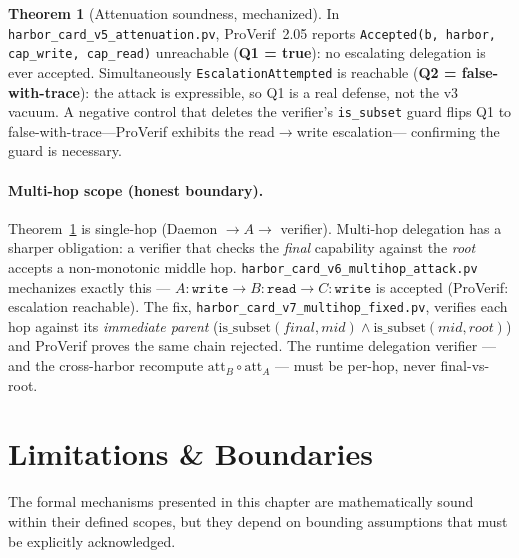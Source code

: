 \documentclass[11pt,a4paper]{article}
\theoremstyle{definition}
\newtheorem{theorem}{Theorem}[section]
\begin{document}
\begin{theorem}[Attenuation soundness, mechanized]\label{thm:attn-sound}
In \texttt{harbor\_card\_v5\_attenuation.pv}, ProVerif~2.05 reports
\texttt{Accepted(b, harbor, cap\_write, cap\_read)} unreachable
(\textbf{Q1 = true}): no escalating delegation is ever accepted. Simultaneously
\texttt{EscalationAttempted} is reachable (\textbf{Q2 = false-with-trace}):
the attack is expressible, so Q1 is a real defense, not the v3 vacuum. A
negative control that deletes the verifier's \texttt{is\_subset} guard flips
Q1 to false-with-trace---ProVerif exhibits the read$\to$write escalation---
confirming the guard is necessary.
\end{theorem}

\paragraph{Multi-hop scope (honest boundary).} Theorem~\ref{thm:attn-sound} is
single-hop (Daemon $\to A \to$ verifier). Multi-hop delegation has a sharper
obligation: a verifier that checks the \emph{final} capability against the
\emph{root} accepts a non-monotonic middle hop. \texttt{harbor\_card\_v6\_multihop\_attack.pv}
mechanizes exactly this --- $A{:}\texttt{write} \to B{:}\texttt{read} \to
C{:}\texttt{write}$ is accepted (ProVerif: escalation reachable). The fix,
\texttt{harbor\_card\_v7\_multihop\_fixed.pv}, verifies each hop against its
\emph{immediate parent} ($\mathrm{is\_subset}(\mathit{final},\mathit{mid}) \wedge
\mathrm{is\_subset}(\mathit{mid},\mathit{root})$) and ProVerif proves the same
chain rejected. The runtime delegation verifier --- and the cross-harbor
recompute $\mathrm{att}_B \circ \mathrm{att}_A$ --- must be per-hop, never
final-vs-root.


\section{Limitations \& Boundaries}\label{sec:anchor-limitations-boundaries}

The formal mechanisms presented in this chapter are mathematically sound within their defined scopes, but they depend on bounding assumptions that must be explicitly acknowledged. 
\end{document}
